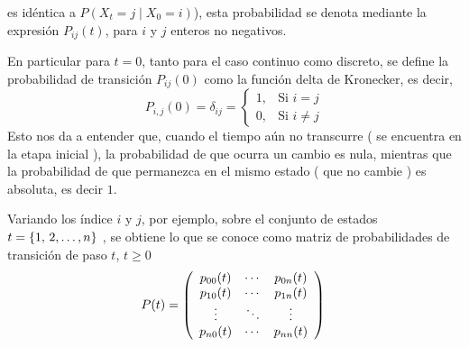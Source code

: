 es idéntica a $P(X _{t} =j \mid X_0= i)$), esta probabilidad se denota mediante la expresión $P_{i j}(t)$, para $i$ y $j$ enteros no negativos.\\
\begin{Obs}
    En particular para $t= 0$, tanto para el caso continuo como discreto, se define la probabilidad de transición $P_{i j}(0)$ como la función delta de Kronecker, es decir,
    $$P_{i,j}(0)=\delta_{i j}=\begin{cases}
        1, & \mbox{Si $i=j$}\\
        0, & \mbox{Si $i\not= j$}
    \end{cases}$$
    Esto nos da a entender que, cuando el tiempo aún no transcurre ( se encuentra en la etapa inicial ), la probabilidad de que ocurra un cambio es nula, mientras que la probabilidad de que permanezca en el mismo estado ( que no cambie ) es absoluta, es decir $1$.
\end{Obs}
Variando los índice $i$ y $j$, por ejemplo, sobre el conjunto de estados $t=\{ 1,\thinspace 2,\ldots, n\}$ , se
obtiene lo que se conoce como matriz de probabilidades de transición de paso $t$, $t\geq 0$
$$P(t)=\left( \begin{array}{ccc}
p_{0 0}(t) & \cdots & p_{0 n}(t) \\ 
p_{1 0}(t) & \cdots & p_{1 n}(t)\\
\vdots & \ddots & \vdots \\
p_{n 0}(t) & \cdots & p_{n n}(t) 
\end{array}\right)\\$$
